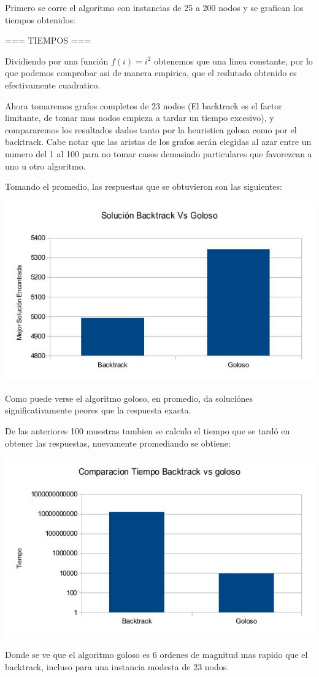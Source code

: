 Primero se corre el algoritmo con instancias de 25 a 200 nodos y se grafican los tiempos obtenidos:


=== TIEMPOS ===

Dividiendo por una función $f(i) = i^2$ obtenemos que una linea constante, por lo que podemos comprobar asi de manera empirica, que el reslutado obtenido es efectivamente cuadratico.

Ahora tomaremos grafos completos de $23$ nodos (El backtrack es el factor limitante, de tomar mas nodos empieza a tardar un tiempo excesivo), y compararemos los resultados dados tanto por la heuristica golosa como por el backtrack. Cabe notar que las aristas de los grafos serán elegidas al azar entre un numero del 1 al 100 para no tomar casos demasiado particulares que favorezcan a uno u otro algoritmo.

Tomando el promedio, las respuestas que se obtuvieron son las siguientes:

\includegraphics[scale=0.5]{Ej3/Soluciones.jpg}

Como puede verse el algoritmo goloso, en promedio, da soluciónes significativamente peores que la respuesta exacta.

De las anteriores 100 muestras tambien se calculo el tiempo que se tardó en obtener las respuestas, nuevamente promediando se obtiene:

\includegraphics[scale=0.5]{Ej3/tiempos.jpg}

Donde se ve que el algoritmo goloso es $6$ ordenes de magnitud mas rapido que el backtrack, incluso para una instancia modesta de $23$ nodos.